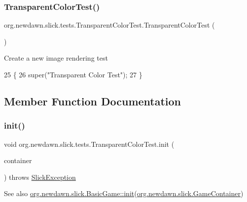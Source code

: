 \subsubsection{\texorpdfstring{Transparent\+Color\+Test()}{TransparentColorTest()}}
{\footnotesize\ttfamily org.\+newdawn.\+slick.\+tests.\+Transparent\+Color\+Test.\+Transparent\+Color\+Test (\begin{DoxyParamCaption}{ }\end{DoxyParamCaption})\hspace{0.3cm}{\ttfamily [inline]}}

Create a new image rendering test 
\begin{DoxyCode}
25                                   \{
26         super(\textcolor{stringliteral}{"Transparent Color Test"});
27     \}
\end{DoxyCode}


\subsection{Member Function Documentation}
\mbox{\label{classorg_1_1newdawn_1_1slick_1_1tests_1_1_transparent_color_test_ab2d2d9ceff13edb0b85ba206691dda0b}} 
\subsubsection{\texorpdfstring{init()}{init()}}
{\footnotesize\ttfamily void org.\+newdawn.\+slick.\+tests.\+Transparent\+Color\+Test.\+init (\begin{DoxyParamCaption}\item[{\mbox{\hyperlink{classorg_1_1newdawn_1_1slick_1_1_game_container}{Game\+Container}}}]{container }\end{DoxyParamCaption}) throws \mbox{\hyperlink{classorg_1_1newdawn_1_1slick_1_1_slick_exception}{Slick\+Exception}}\hspace{0.3cm}{\ttfamily [inline]}}

\begin{DoxySeeAlso}{See also}
\mbox{\hyperlink{classorg_1_1newdawn_1_1slick_1_1_basic_game_a8af0900217e4d389249f71367b22d114}{org.\+newdawn.\+slick.\+Basic\+Game\+::init}}(\mbox{\hyperlink{classorg_1_1newdawn_1_1slick_1_1_game_container}{org.\+newdawn.\+slick.\+Game\+Container}}) 
\end{DoxySeeAlso}


